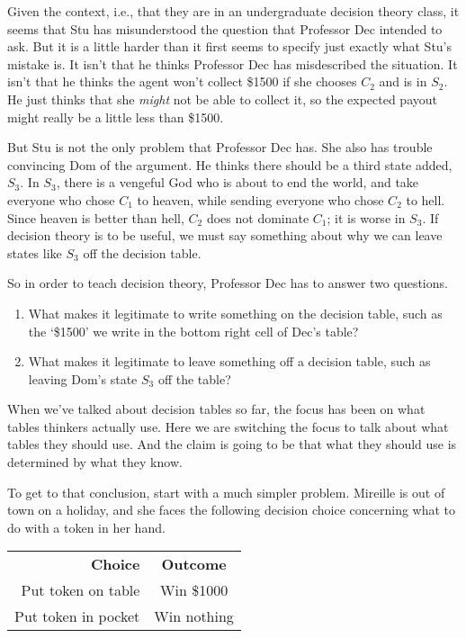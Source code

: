 \documentclass[11pt,]{book}
\providecommand{\tightlist}{%
  \setlength{\itemsep}{0pt}\setlength{\parskip}{0pt}}
\def\toprule{}
\def\bottomrule{}
\begin{document}
Given the context, i.e., that they are in an undergraduate decision theory class, it seems that Stu has misunderstood the question that Professor Dec intended to ask. But it is a little harder than it first seems to specify just exactly what Stu's mistake is. It isn't that he thinks Professor Dec has misdescribed the situation. It isn't that he thinks the agent won't collect \$1500 if she chooses \(C_2\) and is in \(S_2\). He just thinks that she \emph{might} not be able to collect it, so the expected payout might really be a little less than \$1500.

But Stu is not the only problem that Professor Dec has. She also has trouble convincing Dom of the argument. He thinks there should be a third state added, \(S_3\). In \(S_3\), there is a vengeful God who is about to end the world, and take everyone who chose \(C_1\) to heaven, while sending everyone who chose \(C_2\) to hell. Since heaven is better than hell, \(C_2\) does not dominate \(C_1\); it is worse in \(S_3\). If decision theory is to be useful, we must say something about why we can leave states like \(S_3\) off the decision table.

So in order to teach decision theory, Professor Dec has to answer two questions.

\begin{enumerate}
\def\labelenumi{\arabic{enumi}.}
\tightlist
\item
  What makes it legitimate to write something on the decision table, such as the `\$1500' we write in the bottom right cell of Dec's table?
\item
  What makes it legitimate to leave something off a decision table, such as leaving Dom's state \(S_3\) off the table?
\end{enumerate}

When we've talked about decision tables so far, the focus has been on what tables thinkers actually use. Here we are switching the focus to talk about what tables they should use. And the claim is going to be that what they should use is determined by what they know.

To get to that conclusion, start with a much simpler problem. Mireille is out of town on a holiday, and she faces the following decision choice concerning what to do with a token in her hand.

\begin{longtable}[]{@{}rc@{}}
\toprule
\endhead
\textbf{Choice} & \textbf{Outcome}\tabularnewline
Put token on table & Win \$1000\tabularnewline
Put token in pocket & Win nothing\tabularnewline
\bottomrule
\end{longtable}
\end{document}
